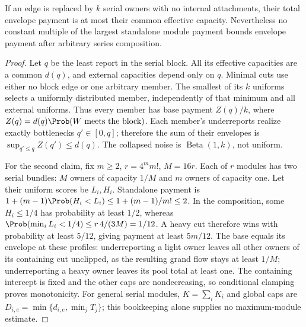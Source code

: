 \begin{proposition}
\label{noise:series}
If an edge is replaced by $k$ serial owners with no internal attachments,
their total envelope payment is at most their common effective capacity.
Nevertheless no constant multiple of the largest standalone module payment
bounds envelope payment after arbitrary series composition.
\end{proposition}
\begin{proof}
Let $q$ be the least report in the serial block. All its effective capacities
are a common $d(q)$, and external capacities depend only on $q$. Minimal cuts
use either no block edge or one arbitrary member. The smallest of its $k$
uniforms selects a uniformly distributed member, independently of that
minimum and all external uniforms. Thus every member has base payment
$Z(q)/k$, where $Z(q)=d(q)\Prob(W\text{ meets the block})$.
Each member's underreports realize exactly bottlenecks $q'\in[0,q]$;
therefore the sum of their envelopes is $\sup_{q'\le q}Z(q')\le d(q)$.
The collapsed noise is $\operatorname{Beta}(1,k)$, not uniform.

For the second claim, fix $m\ge2$, $r=4^m m!$, $M=16r$. Each of $r$
modules has two serial bundles: $M$ owners of capacity $1/M$ and $m$
owners of capacity one. Let their uniform scores be $L_i,H_i$.
Standalone payment is $1+(m-1)\Prob(H_i<L_i)\le1+(m-1)/m!\le2$.
In the composition, some $H_i\le1/4$ has probability at least $1/2$,
whereas $\Prob(\min_iL_i<1/4)\le r\,4/(3M)=1/12$.
A heavy cut therefore wins with probability at least $5/12$, giving payment
at least $5m/12$. The base equals its envelope at these profiles: underreporting
a light owner leaves all other owners of its containing cut unclipped, as
the resulting grand flow stays at least $1/M$; underreporting a heavy owner
leaves its pool total at least one. The containing intercept is fixed and
the other caps are nondecreasing, so conditional clamping proves monotonicity.
For general serial modules, $K=\sum_iK_i$ and global caps are
$D_{i,e}=\min\{d_{i,e},\min_jT_j\}$; this bookkeeping alone supplies no
maximum-module estimate.
\end{proof}

